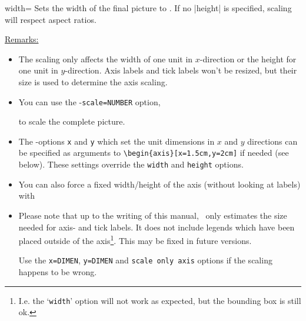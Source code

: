 \begin{pgfplotskey}{width=}
Sets the width of the final picture to . If no |height| is specified, scaling will respect aspect ratios.

\noindent\underline{Remarks:} 
\begin{itemize}
	\item The scaling only affects the width of one unit in $x$-direction or the height for one unit in $y$-direction. Axis labels and tick labels won't be resized, but their size is used to determine the axis scaling.

	\item You can use the \Tikz-\lstinline!scale=NUMBER! option,
	\begin{codeexample}
	\end{codeexample}
	to scale the complete picture.

	\item The \Tikz-options \lstinline!x! and \lstinline!y! which set the unit dimensions in $x$ and $y$ directions can be specified as arguments to \lstinline!\begin{axis}[x=1.5cm,y=2cm]! if needed (see below). These settings override the \lstinline!width! and \lstinline!height! options.

	\item You can also force a fixed width/height of the axis (without looking at labels) with
	\begin{codeexample}
	\end{codeexample}

	\item Please note that up to the writing of this manual, \PGFPlots\ only estimates the size needed for axis- and tick labels. It does not include legends which have been placed outside of the axis\footnote{I.e. the `\texttt{width}' option will not work as expected, but the bounding box is still ok.}. This may be fixed in future versions.

	Use the \lstinline!x=DIMEN!, \lstinline!y=DIMEN! and \lstinline!scale only axis! options if the scaling happens to be wrong.
\end{itemize}
\end{pgfplotskey}

